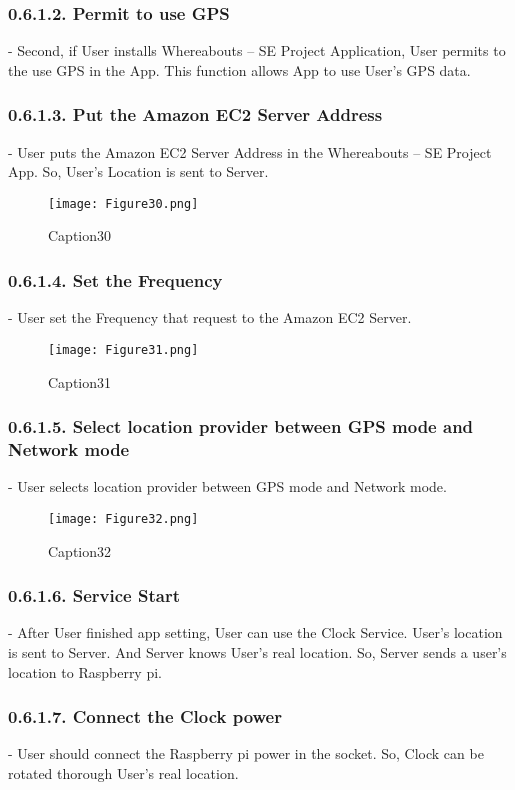 \documentclass[10pt,a4paper,twocolumn]{report}
\begin{document}
		\subsubsection{0.6.1.2. Permit to use GPS}
		- Second, if User installs Whereabouts – SE Project Application, User permits to the use GPS in the App. This function allows App to use User’s GPS data.\\
		\subsubsection{0.6.1.3. Put the Amazon EC2 Server Address}
		- User puts the Amazon EC2 Server Address in the Whereabouts – SE Project App. So, User’s Location is sent to Server.\\
		\begin{figure}[h]
				\texttt{[image: Figure30.png]}
				\caption{Caption30}
				\label{fig30}
		\end{figure}
		\subsubsection{0.6.1.4. Set the Frequency}
		- User set the Frequency that request to the Amazon EC2 Server. \\
		\begin{figure}[h]
				\texttt{[image: Figure31.png]}
				\caption{Caption31}
				\label{fig31}
		\end{figure}
		\subsubsection{0.6.1.5. Select location provider between GPS mode and Network mode}
		- User selects location provider between GPS mode and Network mode.\\
		\begin{figure}[h]
				\texttt{[image: Figure32.png]}
				\caption{Caption32}
				\label{fig32}
		\end{figure}
		\subsubsection{0.6.1.6. Service Start}
		- After User finished app setting, User can use the Clock Service. User’s location is sent to Server. And Server knows User’s real location. So, Server sends a user’s location to Raspberry pi. \\
		\subsubsection{0.6.1.7. Connect the Clock power}
		- User should connect the Raspberry pi power in the socket. So, Clock can be rotated thorough User’s real location.  \\
			 
\end{document}
